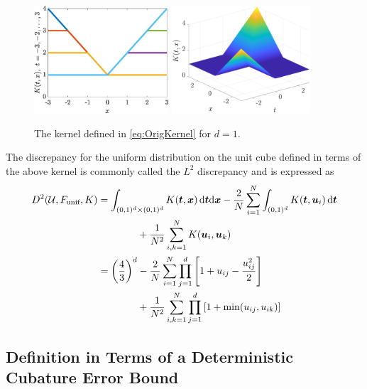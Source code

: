 \documentclass[graybox]{svmult}
\newcommand{\vx}{\boldsymbol{x}}
\newcommand{\vt}{\boldsymbol{t}}
\newcommand{\vu}{\boldsymbol{u}}
\newcommand{\dif}{{\rm d}}
\newcommand{\Udes}{\mathcal{U}}
\newcommand{\unif}{\textup{unif}}
\begin{document}
\begin{figure}
    \centering
    \includegraphics[height = 4cm]{code/KernelPict.eps} \qquad
    \includegraphics[height = 4cm]{code/Kernel3DPict.eps}
    \caption{The kernel defined in \eqref{eq:OrigKernel} for $d=1$.}
    \label{fig:kernelpict}
\end{figure}

The discrepancy for the uniform distribution on the unit cube defined in terms of the above kernel is commonly called the $L^2$ discrepancy and is expressed as
\begin{align} 
\nonumber
    D^2(\Udes,F_\unif,K)
    & = \int_{(0,1)^d \times (0,1)^d} K(\vt,\vx) \, \dif \vt \dif \vx - \frac 2N \sum_{i=1}^N \int_{(0,1)^d} K(\vt,\vu_i) \, \dif \vt\\
    \nonumber
    & \qquad \qquad  + \frac{1}{N^2} \sum_{i,k=1}^N K(\vu_i,\vu_k) \\
    \nonumber
    & = \left( \frac 43 \right)^d 
     - \frac 2N \sum_{i=1}^N \prod_{j=1}^d \left[1 + u_{ij} - \frac{u_{ij}^2}{2} \right] \\
     & \qquad \qquad + \frac 1{N^2} \sum_{i,k=1}^N \prod_{j=1}^d \left[1+ \min(u_{ij},u_{ik})\right]
\end{align}



\subsection{Definition in Terms of a Deterministic Cubature Error Bound}
\label{sec:DetermBound}
\end{document}
